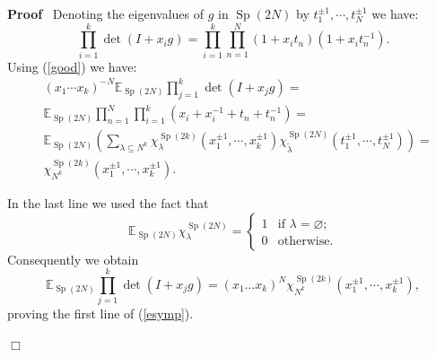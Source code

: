 \documentclass[11pt]{amsart}
\newcommand{\tmop}[1]{\ensuremath{\operatorname{#1}}}
\renewenvironment{proof}{
\noindent\textbf{Proof}\ }{\hspace*{\fill}
\begin{math}\Box\end{math}\medskip}
\begin{document}
\begin{proof}
  Denoting the eigenvalues of $g$ in $\tmop{Sp} ( 2 N )$ by $t_1^{\pm 1},
  \cdots, t_N^{\pm 1}$ we have:
  \[ \prod_{i = 1}^k \det ( I + x_i g ) = \prod_{i = 1}^k \prod_{n = 1}^N ( 1
     + x_i t_n ) ( 1 + x_i t_n^{- 1} ) . \]
  Using (\ref{good}) we have:
  \begin{equation*}
  \begin{aligned}
&    ( x_1 \cdots x_k )^{- N} \mathbb{E}_{\tmop{Sp} ( 2 N )}
\prod_{j = 1}^k
    \det ( I + x_j g )  = \\
   & \mathbb{E}_{\tmop{Sp} ( 2 N )} \prod_{n = 1}^N \prod_{i = 1}^k ( x_i +
    x_i^{- 1} + t_n + t_n^{- 1} )  =  \\
&    \mathbb{E}_{\tmop{Sp} ( 2 N )} \left( \sum_{\lambda \subseteq
N^k}  \chi_{\lambda}^{\tmop{Sp} ( 2 k )} ( x_1^{\pm 1},
    \cdots, x_k^{\pm 1} ) \chi_{\tilde{\lambda}}^{\tmop{Sp} ( 2 N )} (
    t_1^{\pm 1}, \cdots, t_N^{\pm 1} ) \right)  =  \\
&    \chi_{N^k}^{\tmop{Sp} ( 2 k )} ( x_1^{\pm 1}, \cdots,
x_k^{\pm 1} ) .
\end{aligned}
\end{equation*}

  In the last line we used the fact that
  \[ \mathbb{E}_{\tmop{Sp} ( 2 N )} \chi_{\lambda}^{\tmop{Sp} ( 2 N )} =
     \left\{\begin{array}{ll}
       1 & \text{if $\lambda = \varnothing$;}\\
       0 & \text{otherwise} .
     \end{array}\right. \]
  Consequently we obtain
  \begin{equation}
    \mathbb{E}_{\tmop{Sp} ( 2 N )} \prod_{j = 1}^k \det ( I + x_j g ) = ( x_1
    \ldots x_k )^N \chi_{N^k}^{\tmop{Sp} ( 2 k )} ( x_1^{\pm 1}, \cdots, x_k^{\pm 1}
    ),
  \end{equation}
  proving the first line of (\ref{esymp}).


\end{proof}
\end{document}
